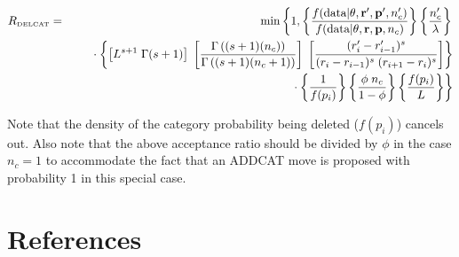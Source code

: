 \documentclass[12pt]{article}
\newcommand{\ncat}{n_c}
\begin{document}
\begin{eqnarray*}
R_{\mbox{\tiny DELCAT}} & = & \min \left\{1, 
\left\{ 
  \frac{f(\mbox{data} | {\bf \theta}, {\bf r}', {\bf p}', \ncat')}{f(\mbox{data} | {\bf \theta}, {\bf r}, {\bf p}, \ncat)} 
\right\}
\left\{ 
  \frac{\ncat'}{\lambda} 
\right\} \right. \\
& & \rule{.2in}{.0in} \cdot 
\left\{ 
  \left[ L^{s+1} \; \Gamma(s+1)\right] \; 
  \left[ \frac{\Gamma\left( (s+1) (\ncat) \right)}{\Gamma\left( (s+1) (\ncat + 1) \right)} \right] \;
  \left[ \frac{(r'_i - r'_{i-1})^s}{(r_i - r_{i-1})^s \; (r_{i+1} - r_i)^s} \right]
\right\} \\
& & \left. \rule{.2in}{.0in} \cdot 
\left\{ 
 \frac{1}{f(p_i)}
\right\} 
\left\{ 
  \frac{\phi \; \ncat}{1-\phi} 
\right\}
\left\{ 
 \frac{f(p_i)}{L}
\right\}
\right\}
\end{eqnarray*}

Note that the density of the category probability being deleted ($f(p_i)$) cancels out. Also note that the above acceptance ratio should be divided by $\phi$ in the case $\ncat = 1$ to accommodate the fact that an ADDCAT move is proposed with probability 1 in this special case.

\section{References}
\renewcommand{\bibsection}{}

\end{document}
